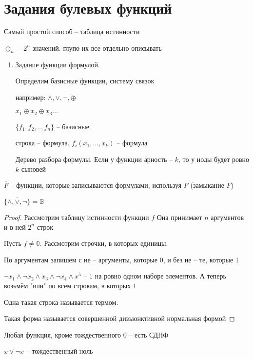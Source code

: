 \documentclass{book}
\theoremstyle{definition}
\begin{document}
    \section{Задания булевых функций}

    Самый простой способ -- таблица истинности

    $\oplus_n$ -- $2^n$ значений. глупо их все отдельно описывать

    \begin{enumerate}
        \item Задание функции формулой.

            Определим базисные функции, систему связок

            например: $\land, \vee, \neg, \oplus$

            $x_1 \oplus x_2 \oplus x_3 \ldots $

            $\{f_1, f_2, .., f_n\}$ -- базисные.

            строка -- формула. $f_i(x_1, \ldots, x_k)$ -- формула

            \begin{definition}
                Дерево разбора формулы. Если у функции арность -- $k$, то у ноды будет ровно $k$ сыновей
            \end{definition}
    \end{enumerate}

    $\overline{F}$ --  функции, которые записываются формулами, используя $F$ (замыкание $F$)

    \begin{theorem}
         $\overline{\{\land, \vee, \neg\}} = \mathbb{B}$
    \end{theorem}
    \begin{proof}
        Рассмотрим таблицу истинности функции $f$ Она принимает $n$ аргументов и в ней $2^n$ строк

        Пусть $f\neq \mathbb{0}$. Рассмотрим строчки, в которых единицы.

        По аргументам запишем с не -- аргументы, которые 0, и без не -- те, которые 1

        $\neg x_1 \land \neg x_2 \land x_3 \land \neg x_4 \land x^5$ -- 1 на ровно одном наборе элементов. А теперь возьмём "или" по всем строкам, в которых $1$ 

        Одна такая строка называется термом. 

        Такая форма называется совершенной дизъюнктивной нормальная формой
    \end{proof}
    \begin{lemma}
        Любая функция, кроме тождественного 0  -- есть СДНФ

        $x\vee \neg x$ -- тождественный ноль
    \end{lemma}
 
\end{document}
